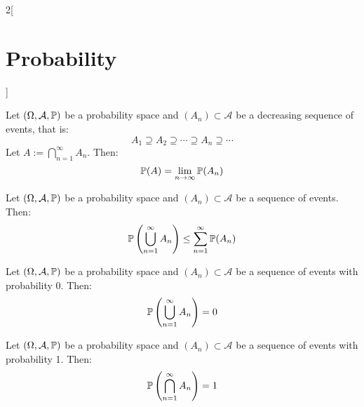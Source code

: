 \documentclass[../../../main_math.tex]{subfiles}
\begin{document}
\begin{multicols}{2}[\section{Probability}]
  \begin{corollary}
    Let $(\Omega,\mathcal{A},\mathbb{P})$ be a probability space and $(A_n)\subset\mathcal{A}$ be a decreasing sequence of events, that is: $$A_1\supseteq A_2\supseteq\cdots\supseteq A_n\supseteq\cdots$$ Let $A:=\bigcap_{n=1}^\infty A_n$. Then: $$\mathbb{P}(A)=\lim_{n\to\infty}\mathbb{P}(A_n)$$
  \end{corollary}
  \begin{proposition}
    Let $(\Omega,\mathcal{A},\mathbb{P})$ be a probability space and $(A_n)\subset\mathcal{A}$ be a sequence of events. Then: $$\mathbb{P}\left(\bigcup_{n=1}^\infty A_n\right)\leq\sum_{n=1}^\infty \mathbb{P}(A_n)$$
  \end{proposition}
  \begin{corollary}
    Let $(\Omega,\mathcal{A},\mathbb{P})$ be a probability space and $(A_n)\subset\mathcal{A}$ be a sequence of events with probability 0. Then: $$\mathbb{P}\left(\bigcup_{n=1}^\infty A_n\right)=0$$
  \end{corollary}
  \begin{corollary}
    Let $(\Omega,\mathcal{A},\mathbb{P})$ be a probability space and $(A_n)\subset\mathcal{A}$ be a sequence of events with probability 1. Then: $$\mathbb{P}\left(\bigcap_{n=1}^\infty A_n\right)=1$$
  \end{corollary}

\end{multicols}
\end{document}
